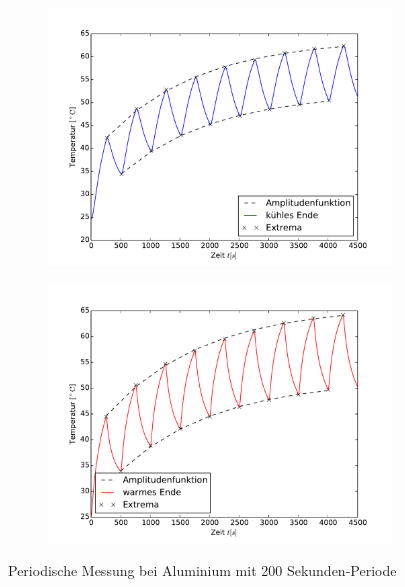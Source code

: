 \begin{figure}[htp]
\label{fig:M3Alu}
\centering
	\begin{subfigure}{0.9\textwidth}
	\centering
	\includegraphics[width=\textwidth]{Bilder/M3_Alu_kuehl.pdf}
	\end{subfigure}
	\begin{subfigure}{0.9\textwidth}
	\centering
	\includegraphics[width=\textwidth]{Bilder/M3_Alu_warm.pdf}
	\end{subfigure}
\caption{Periodische Messung bei Aluminium mit 200 Sekunden-Periode}
\end{figure}
